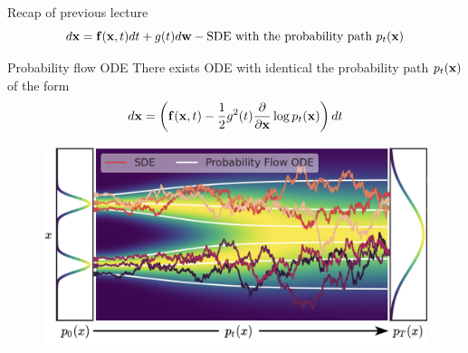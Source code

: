 \begin{frame}{Recap of previous lecture}
	\vspace{-0.5cm}
	\[
		d\mathbf{x} = \mathbf{f}(\mathbf{x}, t) dt + g(t) d \mathbf{w} - \text{SDE with the probability path } p_t(\mathbf{x})
	\]
	\vspace{-0.5cm}
	\begin{block}{Probability flow ODE}
		There exists ODE with identical the probability path $p_t(\mathbf{x})$ of the form
		\[
			d\mathbf{x} = \left(\mathbf{f}(\mathbf{x}, t) -\frac{1}{2} g^2(t) \frac{\partial}{\partial \mathbf{x}} \log p_t(\mathbf{x}) \right) dt
		\]
		\vspace{-0.3cm}
	\end{block}
	\begin{figure}
		\includegraphics[width=0.75\linewidth]{figs/probability_flow}
	\end{figure}
\end{frame}

